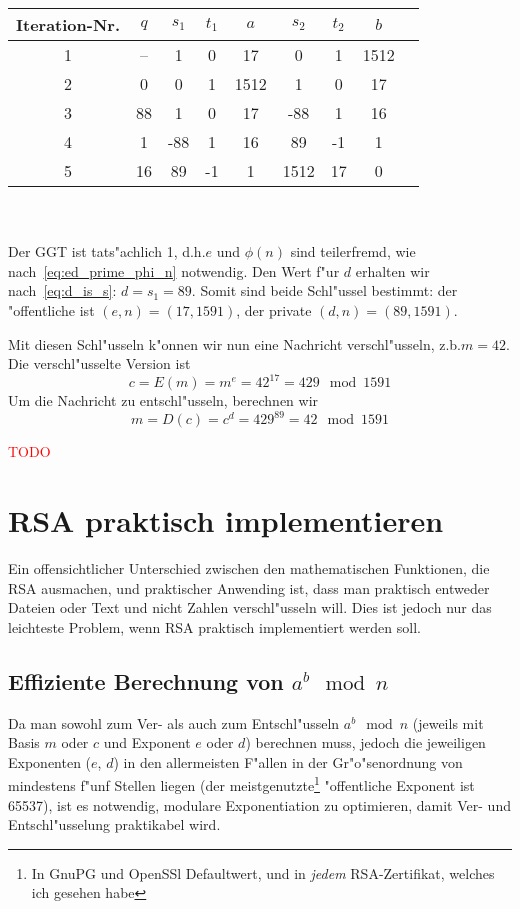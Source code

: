 \documentclass[12pt]{article}
\newcommand{\todo}[1]{\textcolor{red}{\mbox{TODO}}\marginpar{\textcolor{red}{#1}}}
\begin{document}
\begin{tabular}{c|c c c c c c c l}
    Iteration-Nr. & $q$ & $s_1$ & $t_1$ & $a$ & $s_2$ & $t_2$ & $b$ \\
    \hline
    1 & -- & 1 & 0 & 17 & 0 & 1 & 1512 \\
    2 & 0 & 0 & 1 & 1512 & 1 & 0 & 17 \\
    3 & 88 & 1 & 0 & 17 & -88 & 1 & 16 \\
    4 & 1 & -88 & 1 & 16 & 89 & -1 & 1 \\
    5 & 16 & 89 & -1 & 1 & 1512 & 17 & 0 \\
\end{tabular}
~\\~\\
\noindent
Der GGT ist tats"achlich 1, d.h.\@ $e$ und $\phi(n)$ sind teilerfremd, wie nach~\eqref{eq:ed_prime_phi_n} notwendig.
Den Wert f"ur $d$ erhalten wir nach~\eqref{eq:d_is_s}: $d = s_1 = 89$.
Somit sind beide Schl"ussel bestimmt: der "offentliche ist $(e, n) = (17, 1591)$, der private $(d, n) = (89, 1591)$.

Mit diesen Schl"usseln k"onnen wir nun eine Nachricht verschl"usseln, z.b.\@ $m = 42$.
Die verschl"usselte Version ist \[c = E(m) = m^e = 42^{17} = 429 \mod 1591\]
Um die Nachricht zu entschl"usseln, berechnen wir
\[m = D(c) = c^d = 429^{89} = 42 \mod 1591\]

\todo{Angriff?}

\section{RSA praktisch implementieren}

Ein offensichtlicher Unterschied zwischen den mathematischen Funktionen,
die RSA ausmachen, und praktischer Anwending ist, dass man praktisch entweder Dateien
oder Text und nicht Zahlen verschl"usseln will.
Dies ist jedoch nur das leichteste Problem, wenn RSA praktisch implementiert werden soll.

\subsection{Effiziente Berechnung von $a^b \mod n$}
\label{subsec:practical:exp}

Da man sowohl zum Ver- als auch zum Entschl"usseln $a^b \mod n$
(jeweils mit Basis $m$ oder $c$ und Exponent $e$ oder $d$) berechnen muss,
jedoch die jeweiligen Exponenten ($e$, $d$) in den allermeisten F"allen
in der Gr"o"senordnung von mindestens f"unf Stellen liegen
(der meistgenutzte\footnote{In GnuPG und OpenSSl Defaultwert,
und in \emph{jedem} RSA-Zertifikat, welches ich gesehen habe}
"offentliche Exponent ist 65537),
ist es notwendig, modulare Exponentiation zu optimieren,
damit Ver- und Entschl"usselung praktikabel wird.
\end{document}
